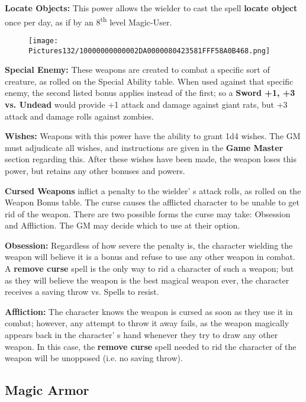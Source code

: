 \documentclass[a4paper,twoside,openany,10pt]{book}
\begin{document}
\begin{multicols}{2}
\textbf{Locate Objects:} This power allows the wielder to cast the spell \textbf{locate object} once per day, as if by an 8\textsuperscript{th} level Magic-User.

\begin{wrapfigure}{l}{0.25\textwidth}
	\texttt{[image: Pictures132/10000000000002DA0000080423581FFF58A0B468.png]}\medskip
\end{wrapfigure}

\textbf{Special Enemy:} These weapons are created to combat a specific sort of creature, as rolled on the Special Ability table. When used against that specific enemy, the second listed bonus applies instead of the first; so a \textbf{Sword +1, +3 vs. Undead} would provide +1 attack and damage against giant rats, but +3 attack and damage rolls against zombies.

\textbf{Wishes:} Weapons with this power have the ability to grant 1d4 wishes. The GM must adjudicate all wishes, and instructions are given in the \textbf{Game Master} section regarding this. After these wishes have been made, the weapon loses this power, but retains any other bonuses and powers.

\textbf{Cursed Weapons} inflict a penalty to the wielder' s attack rolls, as rolled on the Weapon Bonus table. The curse causes the afflicted character to be unable to get rid of the weapon. There are two possible forms the curse may take: Obsession and Affliction. The GM may decide which to use at their option. 

\textbf{Obsession:} Regardless of how severe the penalty is, the character wielding the weapon will believe it is a bonus and refuse to use any other weapon in combat. A \textbf{remove curse} spell is the only way to rid a character of such a weapon; but as they will believe the weapon is the best magical weapon ever, the character receives a saving throw vs. Spells to resist.

\textbf{Affliction: } The character knows the weapon is cursed as soon as they use it in combat; however, any attempt to throw it away fails, as the weapon magically appears back in the character' s hand whenever they try to draw any other weapon. In this case, the \textbf{remove curse} spell needed to rid the character of the weapon will be unopposed (i.e. no saving throw).


\subsection{Magic Armor}\label{magic-armor-1}


\end{multicols}
\end{document}

